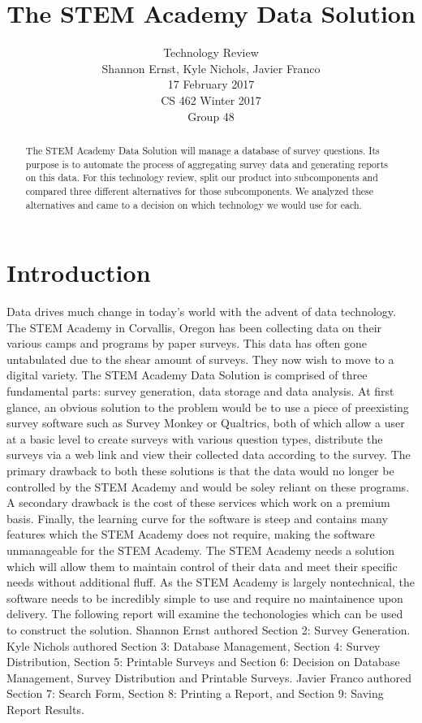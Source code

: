 \documentclass[letterpaper,10pt,serif, draftclsnofoot,onecolumn, compsoc, titlepage]{IEEEtran}
\title{The STEM Academy Data Solution}
\author{Technology Review \\ Shannon Ernst, Kyle Nichols, Javier Franco\\ 17 February 2017\\ CS 462 Winter 2017\\ Group 48}
\begin{document}
\maketitle
\begin{abstract}
The STEM Academy Data Solution will manage a database of survey questions.
Its purpose is to automate the process of aggregating survey data and generating reports on this data.
For this technology review, split our product into subcomponents and compared three different alternatives for those subcomponents.
We analyzed these alternatives and came to a decision on which technology we would use for each.
\end{abstract}
\newpage
\tableofcontents
\newpage
\section{Introduction}
Data drives much change in today's world with the advent of data technology. The STEM Academy in Corvallis,
 Oregon has been collecting data on their various camps and programs by paper surveys. This data has often 
gone untabulated due to the shear amount of surveys. They now wish to move to a digital variety.
 The STEM Academy Data Solution is comprised of three fundamental parts: survey generation, data storage and data analysis.
At first glance, an obvious solution to the problem would be to use a piece of preexisting survey software such as Survey Monkey \cite{surveyMonkey}
or Qualtrics\cite{qualtrics}, both of which allow a user at a basic level to create surveys with various question types, distribute the surveys 
via a web link and view their collected data according to the survey. The primary drawback to both these solutions is that the 
data would no longer be controlled by the STEM Academy and would be soley reliant on these programs. A secondary drawback
 is the cost of these services which work on a premium basis\cite{surveyMonkeyCost}. Finally, the learning curve for the software is steep and contains
many features which the STEM Academy does not require, making the software unmanageable for the STEM Academy. 
The STEM Academy needs a solution which will allow them to maintain control of their data and meet their specific needs without
additional fluff. As the STEM Academy is largely nontechnical, the software needs to be incredibly simple to use and require no 
maintainence upon delivery. The following report will examine the techonologies which can be used to construct the solution. Shannon Ernst authored Section 2: Survey Generation. Kyle Nichols authored Section 3: Database Management, Section 4: Survey Distribution, Section 5: Printable Surveys and Section 6: Decision on Database Management, Survey Distribution and Printable Surveys. Javier Franco authored Section 7: Search Form, Section 8: Printing a Report, and Section 9: Saving Report Results. 
\end{document}

